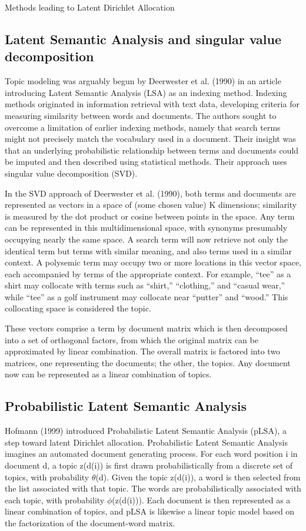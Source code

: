 \documentclass[11pt]{article}
\begin{document}
\begin{section}{Methods leading to Latent Dirichlet Allocation}

\subsection{Latent Semantic Analysis and singular value decomposition}

Topic modeling was arguably begun by Deerwester et al. (1990) in an article introducing Latent Semantic Analysis (LSA) as an indexing method. Indexing methods originated in information retrieval with text data, developing criteria for measuring similarity between words and documents. The authors sought to overcome a limitation of earlier indexing methods, namely that search terms might not precisely match the vocabulary used in a document. Their insight was that an underlying probabilistic relationship between terms and documents could be imputed and then described using statistical methods. Their approach uses singular value decomposition (SVD). 

In the SVD approach of Deerwester et al. (1990), both terms and documents are represented as vectors in a space of (some chosen value) K dimensions; similarity is measured by the dot product or cosine between points in the space. Any term can be represented in this multidimensional space, with synonyms presumably occupying nearly the same space. A search term will now retrieve not only the identical term but terms with similar meaning, and also terms used in a similar context. A polysemic term may occupy two or more locations in this vector space, each accompanied by terms of the appropriate context. For example, “tee” as a shirt may collocate with terms such as “shirt,” “clothing,” and “casual wear,” while “tee” as a golf instrument may collocate near “putter” and “wood.” This collocating space is considered the topic. 

These vectors comprise a term by document matrix which is then decomposed into a set of orthogonal factors, from which the original matrix can be approximated by linear combination. The overall matrix is factored into two matrices, one representing the documents; the other, the topics. Any document now can be represented as a linear combination of topics. 

\subsection{Probabilistic Latent Semantic Analysis}
Hofmann (1999) introduced Probabilistic Latent Semantic Analysis (pLSA), a step toward latent Dirichlet allocation. Probabilistic Latent Semantic Analysis imagines an automated document generating process. For each word position i in document d, a topic z(d(i)) is first drawn probabilistically from a discrete set of topics, with probability $\theta$(d). Given the topic z(d(i)), a word is then selected from the list associated with that topic. The words are probabilistically associated with each topic, with probability $\phi$(z(d(i))). Each document is then represented as a linear combination of topics, and pLSA is likewise a linear topic model based on the factorization of the document-word matrix. 


\end{section}
\end{document}
